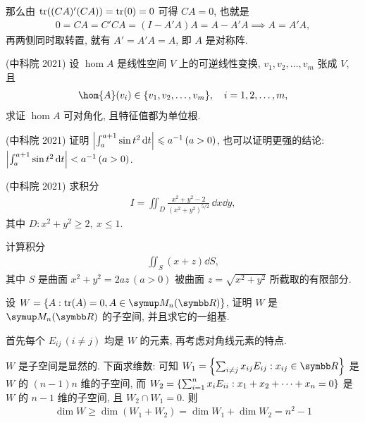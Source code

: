 \documentclass{ctexart}
\begin{document}
\begin{exercise}[resume=exer]
\begin{answer}
            那么由 $ \tr((CA)'(CA)) = \tr(0) = 0 $ 可得 $ CA = 0 $, 也就是
            \begin{align*}
                0 = CA = C'CA = (I - A'A)A = A - A'A \implies A = A'A,
            \end{align*}
            再两侧同时取转置, 就有 $ A' = A'A = A $, 即 $ A $ 是对称阵.
        \end{answer}
        \item (中科院 2021) 设 $ \hom{A} $ 是线性空间 $ V $ 上的可逆线性变换, $ v_{1}, v_{2}, \dots, v_{m} $ 张成 $ V $, 且
        \begin{align*}
            \hom{A}(v_{i}) \in \set{v_{1}, v_{2}, \dots, v_{m}}, \quad i = 1, 2, \dots, m,
        \end{align*}
        求证 $ \hom{A} $ 可对角化, 且特征值都为单位根. 
        \item (中科院 2021) 证明 $ \abs{\int_{a}^{a + 1} \sin t^{2} \dd{t}} \leqslant a^{-1}\,(a > 0) $, 也可以证明更强的结论: $ \abs{\int_{a}^{a + 1} \sin t^{2} \dd{t}} < a^{-1}\,(a > 0) $. 
        \item (中科院 2021) 求积分 
        \begin{align*}
            I = \iint_{D} \frac{x^{2} + y^{2} - 2}{(x^{2} + y^{2})^{5/2}}\,\dd x\dd y,
        \end{align*}
        其中 $ D: x^{2} + y^{2} \ge 2,\ x \le 1 $.
        \item 计算积分
        \begin{align*}
            \iint_{S} (x + z) \dd{S},
        \end{align*}
        其中 $ S $ 是曲面 $ x^{2} + y^{2} = 2az\,(a > 0) $ 被曲面 $ z = \sqrt{x^{2} + y^{2}} $ 所截取的有限部分.
        \item 设 $ W = \set{A : \tr(A) = 0, A \in \MM} $, 证明 $ W $ 是 $ \MM $ 的子空间, 并且求它的一组基.
        \begin{hint}
            首先每个 $ E_{ij}\,(i \ne j) $ 均是 $ W $ 的元素, 再考虑对角线元素的特点. 
        \end{hint}
        \begin{answer}
            $ W $ 是子空间是显然的. 下面求维数: 可知 $ W_{1} = \set{\sum_{i \ne j} x_{ij}E_{ij} : x_{ij} \in \R} $ 是 $ W $ 的 $ (n - 1)n $ 维的子空间, 而 $ W_{2} = \qty{\sum_{i = 1}^{n} x_{i}E_{ii} : x_{1} + x_{2} + \dots + x_{n} = 0} $ 是 $ W  $ 的 $ n - 1 $ 维的子空间, 且 $ W_{2} \cap W_{1} = 0 $. 则
            \begin{align*}
                \dim W \ge \dim(W_{1} + W_{2}) = \dim W_{1} + \dim W_{2} = n^{2} - 1

\end{align*}
\end{answer}
\end{exercise}
\end{document}
